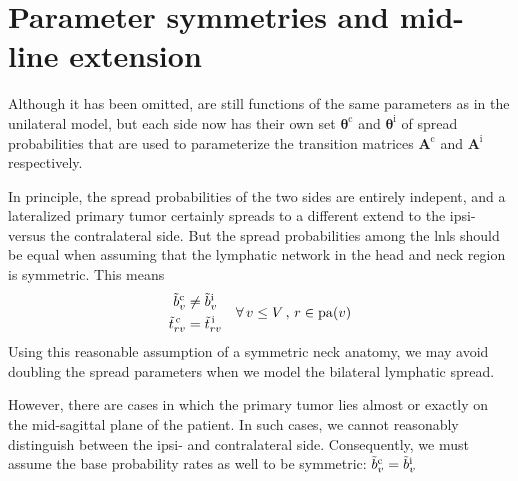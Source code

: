 \documentclass[\relativeRoot/main.tex]{subfiles}
\begin{document}
\section{Parameter symmetries and mid-line extension}
\label{sec:bilateral:parameter_symmetries}

Although it has been omitted,  are still functions of the same parameters as in the unilateral model, but each side now has their own set $\boldsymbol{\theta}^\text{c}$ and $\boldsymbol{\theta}^\text{i}$ of spread probabilities that are used to parameterize the transition matrices $\mathbf{A}^\text{c}$ and $\mathbf{A}^\text{i}$ respectively.

In principle, the spread probabilities of the two sides are entirely indepent, and a lateralized primary tumor certainly spreads to a different extend to the ipsi- versus the contralateral side. But the spread probabilities among the \glspl{lnl} should be equal when assuming that the lymphatic network in the head and neck region is symmetric. This means
%
\begin{equation}
    \begin{aligned}
        \Tilde{b}^\text{c}_v &\neq \Tilde{b}^\text{i}_v \\
        \Tilde{t}^\text{\,c}_{rv} &= \Tilde{t}^\text{\,i}_{rv}
    \end{aligned}
    \quad \forall \, v \leq V \, , \, r \in \operatorname{pa}(v)
\end{equation}
%
Using this reasonable assumption of a symmetric neck anatomy, we may avoid doubling the spread parameters when we model the bilateral lymphatic spread.

However, there are cases in which the primary tumor lies almost or exactly on the mid-sagittal plane of the patient. In such cases, we cannot reasonably distinguish between the ipsi- and contralateral side. Consequently, we must assume the base probability rates as well to be symmetric: $\Tilde{b}^\text{c}_v = \Tilde{b}^\text{i}_v$
\end{document}
